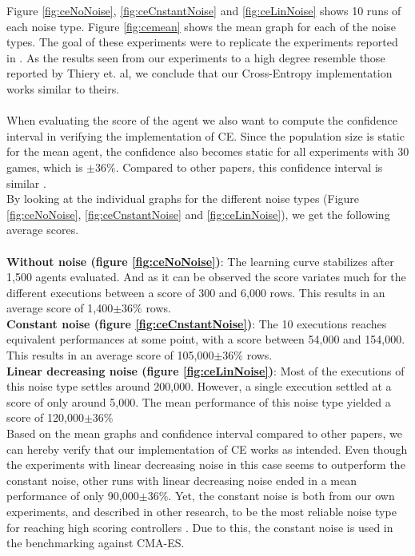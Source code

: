 Figure \ref{fig:ceNoNoise}, \ref{fig:ceCnstantNoise} and
\ref{fig:ceLinNoise} shows 10 runs of each noise type. Figure
\ref{fig:cemean} shows the mean graph for each of the noise types.
The goal of these experiments were to replicate the experiments 
reported in \citep{thiery:09}. As the results seen from our experiments
to a high degree resemble those reported by Thiery et. al, we conclude
that our Cross-Entropy implementation works similar to theirs.\\
\\
When evaluating the score of the agent we also want to compute the confidence
interval in verifying the implementation of CE. Since the population size is static for the 
mean agent, the confidence also becomes static for all experiments with 30
games, which is $\pm36\%$. Compared to other papers, this confidence interval
is similar \citep{scherrer2009}.\\
By looking at the individual graphs for the different noise types 
(Figure \ref{fig:ceNoNoise}, \ref{fig:ceCnstantNoise} and
\ref{fig:ceLinNoise}), we get the following average scores.\\
\\
\textbf{Without noise (figure \ref{fig:ceNoNoise})}: The learning curve
stabilizes after 1,500 agents evaluated. And as it can be observed the
score variates much for the different executions between a score of 300 and 6,000
rows. This results in an average score of 1,400$\pm36\%$ rows.\\
\textbf{Constant noise (figure \ref{fig:ceCnstantNoise})}: 
The 10 executions reaches equivalent performances at some point, 
with a score between
54,000 and 154,000. This results in an average score of 105,000$\pm36\%$ rows.\\
\textbf{Linear decreasing noise (figure \ref{fig:ceLinNoise})}:
Most of the executions of this noise type settles around 200,000.
However, a single execution settled at a score of only around 5,000.
The mean performance of this noise type yielded a score of
120,000$\pm36\%$ \\

Based on the mean graphs and confidence interval compared to other papers, we can
hereby verify that our implementation of CE works as intended. Even though the
experiments with linear decreasing noise in this case seems to outperform
the constant noise, other runs with linear decreasing noise ended in a mean 
performance of only 90,000$\pm36\%$. Yet, the constant noise is both from our
own experiments, and described in other research, to be the most reliable
noise type for reaching high scoring controllers \citep{scherrer2009}. 
Due to this, the constant noise is used in the 
benchmarking against CMA-ES.\\

